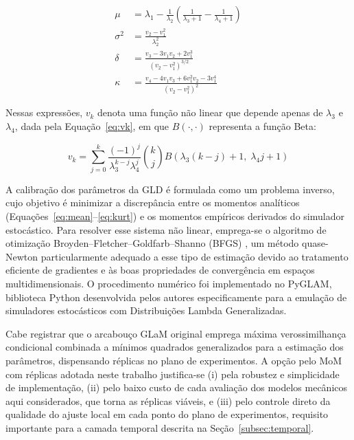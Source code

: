 \begin{align}
\mu &= \lambda_1 - \frac{1}{\lambda_2} \left( \frac{1}{\lambda_3 + 1} - \frac{1}{\lambda_4 + 1} \right) \label{eq:mean} \\
\sigma^2 &= \frac{v_2 - v_1^2}{\lambda_2^2} \label{eq:var} \\
\delta &= \frac{v_3 - 3v_1v_2 + 2v_1^3}{(v_2 - v_1^2)^{3/2}} \label{eq:skew} \\
\kappa &= \frac{v_4 - 4v_1v_3 + 6v_1^2v_2 - 3v_1^4}{(v_2 - v_1^2)^2} \label{eq:kurt}
\end{align}

Nessas expressões, $v_k$ denota uma função não linear que depende apenas de $\lambda_3$ e $\lambda_4$, dada pela Equação~\eqref{eq:vk}, em que $B(\cdot, \cdot)$ representa a função Beta:

\begin{equation}
v_k = \sum_{j=0}^{k} \frac{(-1)^j}{\lambda_3^{k-j} \lambda_4^j} \binom{k}{j} B\!\left(\lambda_3(k-j) + 1,\; \lambda_4 j + 1\right) \label{eq:vk}
\end{equation}

A calibração dos parâmetros da GLD é formulada como um problema inverso, cujo objetivo é minimizar a discrepância entre os momentos analíticos (Equações~\ref{eq:mean}--\ref{eq:kurt}) e os momentos empíricos derivados do simulador estocástico. Para resolver esse sistema não linear, emprega-se o algoritmo de otimização Broyden--Fletcher--Goldfarb--Shanno (BFGS) \citep{nocedal2006}, um método quase-Newton particularmente adequado a esse tipo de estimação devido ao tratamento eficiente de gradientes e às boas propriedades de convergência em espaços multidimensionais. O procedimento numérico foi implementado no PyGLAM, biblioteca Python desenvolvida pelos autores especificamente para a emulação de simuladores estocásticos com Distribuições Lambda Generalizadas.

Cabe registrar que o arcabouço GLaM original \citep{ZhuSudret2021} emprega máxima verossimilhança condicional combinada a mínimos quadrados generalizados para a estimação dos parâmetros, dispensando réplicas no plano de experimentos. A opção pelo MoM com réplicas adotada neste trabalho justifica-se (i) pela robustez e simplicidade de implementação, (ii) pelo baixo custo de cada avaliação dos modelos mecânicos aqui considerados, que torna as réplicas viáveis, e (iii) pelo controle direto da qualidade do ajuste local em cada ponto do plano de experimentos, requisito importante para a camada temporal descrita na Seção~\ref{subsec:temporal}.

